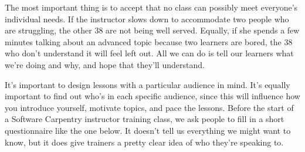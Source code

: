 The most important thing is to accept that no class can possibly meet
everyone's individual needs. If the instructor slows down to accommodate
two people who are struggling, the other 38 are not being well served.
Equally, if she spends a few minutes talking about an advanced topic
because two learners are bored, the 38 who don't understand it will feel
left out. All we can do is tell our learners what we're doing and why,
and hope that they'll understand.

It's important to design lessons with a particular audience in mind.
It's equally important to find out who's in each specific audience,
since this will influence how you introduce yourself, motivate topics,
and pace the lessons.  Before the start of a Software Carpentry
instructor training class, we ask people to fill in a short
questionnaire like the one below.  It doesn't tell us everything we
might want to know, but it does give trainers a pretty clear idea of
who they're speaking to.

